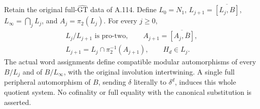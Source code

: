 Retain the original full-\(\widehat{\mathrm{GT}}\) data of A.114. Define
\(L_0=N_1\), \(L_{j+1}=\overline{[L_j,B]}\),
\(L_\infty=\bigcap_j L_j\), and \(A_j=\pi_2(L_j)\).
For every \(j\ge0\),
\[
 \begin{gathered}
 L_j/L_{j+1}\text{ is pro-two},\qquad
 A_{j+1}=\overline{[A_j,\overline B]},\\
 L_{j+1}=L_j\cap\pi_2^{-1}(A_{j+1}),\qquad H_d\in L_j.
 \end{gathered}
\]
The actual word assignments define compatible modular automorphisms
of every \(B/L_j\) and of \(B/L_\infty\), with the original involution
intertwining. A single full peripheral automorphism of \(B\), sending
\(\delta\) literally to \(\delta^d\), induces this whole quotient system.
No cofinality or full equality with the canonical substitution is asserted.
